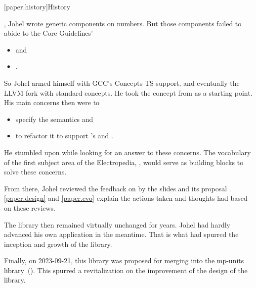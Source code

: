 

[paper.history]{History}

\pnum
{}, Johel wrote generic components on numbers.
But those components failed to abide to the \Cpp{} Core Guidelines'
\begin{itemize}
\item {} and
\item {}.
\end{itemize}

\pnum
So Johel armed himself with GCC's Concepts TS support,
and eventually the LLVM fork with \Cpp{} standard concepts.
He took the  concept from  as a starting point.
His main concerns then were to
\begin{itemize}
\item specify the semantics and
\item to refactor it to support 's  and .
\end{itemize}

\pnum
He stumbled upon  while looking for an answer to these concerns.
The vocabulary of the first subject area of the Electropedia,
,
would serve as building blocks to solve these concerns.

\pnum
From there, Johel reviewed the feedback on  by the slides  and its proposal \hrefVI{}.
\ref{paper.design} and \ref{paper.evo} explain the actions taken and thoughts had based on these reviews.

\pnum
The library then remained virtually unchanged for years.
Johel had hardly advanced his own application in the meantime.
That is what had spurred the inception and growth of the library.

\pnum
Finally, on 2023-09-21, this library was proposed for merging into the mp-units library~(\hrefVII{}).
This spurred a revitalization on the improvement of the design of the library.
